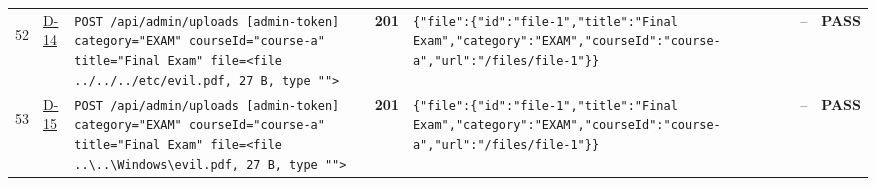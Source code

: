 \documentclass[10pt,a4paper]{article}
\begin{document}
\begin{landscape}
\begin{longtable}{@{}P{0.6cm}P{0.9cm}P{8.5cm}P{1.0cm}P{6.2cm}P{4.2cm}P{1.1cm}@{}}
\hypertarget{call52}{52} & \hyperlink{test-D-14}{D-14} & \texttt{POST /\allowbreak{}api/\allowbreak{}admin/\allowbreak{}uploads [admin-\allowbreak{}token] category=\allowbreak{}"\allowbreak{}EXAM"\allowbreak{} courseId=\allowbreak{}"\allowbreak{}course-\allowbreak{}a"\allowbreak{} title=\allowbreak{}"\allowbreak{}Final Exam"\allowbreak{} file=\allowbreak{}<file .\allowbreak{}.\allowbreak{}/\allowbreak{}.\allowbreak{}.\allowbreak{}/\allowbreak{}.\allowbreak{}.\allowbreak{}/\allowbreak{}etc/\allowbreak{}evil.\allowbreak{}pdf,\allowbreak{} 27 B,\allowbreak{} type "\allowbreak{}"\allowbreak{}>} & \textcolor{passgreen}{\textbf{201}} & \texttt{\{"\allowbreak{}file"\allowbreak{}:\allowbreak{}\{"\allowbreak{}id"\allowbreak{}:\allowbreak{}"\allowbreak{}file-\allowbreak{}1"\allowbreak{},\allowbreak{}"\allowbreak{}title"\allowbreak{}:\allowbreak{}"\allowbreak{}Final Exam"\allowbreak{},\allowbreak{}"\allowbreak{}category"\allowbreak{}:\allowbreak{}"\allowbreak{}EXAM"\allowbreak{},\allowbreak{}"\allowbreak{}courseId"\allowbreak{}:\allowbreak{}"\allowbreak{}course-\allowbreak{}a"\allowbreak{},\allowbreak{}"\allowbreak{}url"\allowbreak{}:\allowbreak{}"\allowbreak{}/\allowbreak{}files/\allowbreak{}file-\allowbreak{}1"\allowbreak{}\}\}} & -- & \textcolor{passgreen}{\textbf{PASS}} \\
\hypertarget{call53}{53} & \hyperlink{test-D-15}{D-15} & \texttt{POST /\allowbreak{}api/\allowbreak{}admin/\allowbreak{}uploads [admin-\allowbreak{}token] category=\allowbreak{}"\allowbreak{}EXAM"\allowbreak{} courseId=\allowbreak{}"\allowbreak{}course-\allowbreak{}a"\allowbreak{} title=\allowbreak{}"\allowbreak{}Final Exam"\allowbreak{} file=\allowbreak{}<file .\allowbreak{}.\allowbreak{}\textbackslash{}\allowbreak{}.\allowbreak{}.\allowbreak{}\textbackslash{}\allowbreak{}Windows\textbackslash{}\allowbreak{}evil.\allowbreak{}pdf,\allowbreak{} 27 B,\allowbreak{} type "\allowbreak{}"\allowbreak{}>} & \textcolor{passgreen}{\textbf{201}} & \texttt{\{"\allowbreak{}file"\allowbreak{}:\allowbreak{}\{"\allowbreak{}id"\allowbreak{}:\allowbreak{}"\allowbreak{}file-\allowbreak{}1"\allowbreak{},\allowbreak{}"\allowbreak{}title"\allowbreak{}:\allowbreak{}"\allowbreak{}Final Exam"\allowbreak{},\allowbreak{}"\allowbreak{}category"\allowbreak{}:\allowbreak{}"\allowbreak{}EXAM"\allowbreak{},\allowbreak{}"\allowbreak{}courseId"\allowbreak{}:\allowbreak{}"\allowbreak{}course-\allowbreak{}a"\allowbreak{},\allowbreak{}"\allowbreak{}url"\allowbreak{}:\allowbreak{}"\allowbreak{}/\allowbreak{}files/\allowbreak{}file-\allowbreak{}1"\allowbreak{}\}\}} & -- & \textcolor{passgreen}{\textbf{PASS}} \\

\end{longtable}
\end{landscape}
\end{document}
